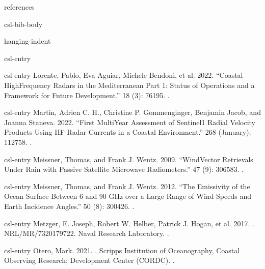 \documentclass[a4paper,10pt,english]{sphinxmanual}
\begin{document}
\begin{sphinxuseclass}{references}
\begin{sphinxuseclass}{csl-bib-body}
\begin{sphinxuseclass}{hanging-indent}
\begin{sphinxuseclass}{csl-entry}
\end{sphinxuseclass}
\begin{sphinxuseclass}{csl-entry}
\sphinxAtStartPar
Lorente, Pablo, Eva Aguiar, Michele Bendoni, et al. 2022. “Coastal High\sphinxhyphen{}Frequency Radars in the Mediterranean \textendash{} Part 1: Status of Operations and a Framework for Future Development.”  18 (3): 761\textendash{}95. .

\end{sphinxuseclass}
\begin{sphinxuseclass}{csl-entry}
\sphinxAtStartPar
Martin, Adrien C. H., Christine P. Gommenginger, Benjamin Jacob, and Joanna Staneva. 2022. “First Multi\sphinxhyphen{}Year Assessment of Sentinel\sphinxhyphen{}1 Radial Velocity Products Using HF Radar Currents in a Coastal Environment.”  268 (January): 112758. .

\end{sphinxuseclass}
\begin{sphinxuseclass}{csl-entry}
\sphinxAtStartPar
Meissner, Thomas, and Frank J. Wentz. 2009. “Wind\sphinxhyphen{}Vector Retrievals Under Rain with Passive Satellite Microwave Radiometers.”  47 (9): 3065\textendash{}83. .

\end{sphinxuseclass}
\begin{sphinxuseclass}{csl-entry}
\sphinxAtStartPar
Meissner, Thomas, and Frank J. Wentz. 2012. “The Emissivity of the Ocean Surface Between 6 and 90 GHz over a Large Range of Wind Speeds and Earth Incidence Angles.”  50 (8): 3004\textendash{}26. .

\end{sphinxuseclass}
\begin{sphinxuseclass}{csl-entry}
\sphinxAtStartPar
Metzger, E. Joseph, Robert W. Helber, Patrick J. Hogan, et al. 2017. . NRL/MR/7320\textendash{}17\sphinxhyphen{}9722. Naval Research Laboratory. .

\end{sphinxuseclass}
\begin{sphinxuseclass}{csl-entry}
\sphinxAtStartPar
Otero, Mark. 2021. . Scripps Institution of Oceanography, Coastal Observing Research; Development Center (CORDC). .


\end{sphinxuseclass}
\end{sphinxuseclass}
\end{sphinxuseclass}
\end{sphinxuseclass}
\end{document}
